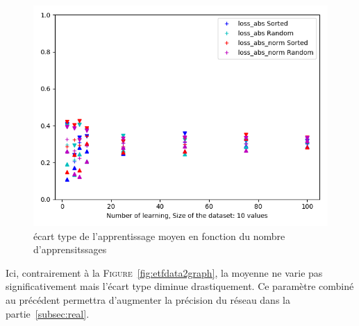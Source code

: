 \begin{figure}[H]
    \center
    \includegraphics[height=\moyen]{pict/appfn.png}
	\caption{écart type de l'apprentissage moyen en fonction du nombre d'apprensitssages}
	\label{fig:etfngraph1}
\end{figure}
\vspace{-5pt}
Ici, contrairement à la \textsc{Figure}\ \ref{fig:etfdata2graph}, la moyenne ne varie pas significativement mais l'écart type diminue drastiquement.
Ce paramètre combiné au précédent permettra d'augmenter la précision du réseau dans la partie\ \ref{subsec:real}.


